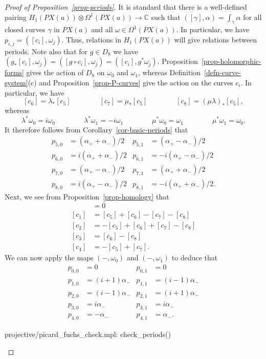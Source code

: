 \documentclass[reqno]{amsart}
\newcommand{\Om}        {\Omega}
\newcommand{\al}        {\alpha}
\newcommand{\gm}        {\gamma}
\newcommand{\lm}        {\lambda}
\newcommand{\om}        {\omega}
\newcommand{\C}         {{\mathbb{C}}}
\newcommand{\ot}        {\otimes}
\renewcommand{\:}{\colon}
\theoremstyle{definition}
\begin{document}
\begin{proof}[Proof of Proposition~\ref{prop-periods}]
 It is standard that there is a well-defined pairing
 $H_1(PX(a))\ot\Om^1(PX(a))\to\C$ such that $([\gm],\al)=\int_\gm\al$
 for all closed curves $\gm$ in $PX(a)$ and all $\om\in\Om^1(PX(a))$.
 In particular, we have $p_{i,j}=([c_i],\om_j)$.  Thus, relations in
 $H_1(PX(a))$ will give relations between periods.  Note also that for
 $g\in D_8$ we have
 $(g_*[c_i],\om_j)=([g\circ c_i],\om_j)=([c_i],g^*\om_j)$.
 Proposition~\ref{prop-holomorphic-forms} gives the action of $D_8$ on
 $\om_0$ and $\om_1$, whereas Definition~\ref{defn-curve-system}(c)
 and Proposition~\ref{prop-P-curves} give the action on the curves
 $c_i$.  In particular, we have
 \[ [c_6] = \lm_*[c_5] \hspace{4em}
    [c_7] = \mu_*[c_5] \hspace{4em}
    [c_8] = (\mu\lm)_*[c_5],
 \]
 whereas
 \[ \lm^*\om_0 = i\om_0 \hspace{4em}
    \lm^*\om_1 = -i\om_1 \hspace{4em}
    \mu^*\om_0 = \om_1  \hspace{4em}
    \mu^*\om_1 = \om_0.
 \]
 It therefore follows from Corollary~\ref{cor-basic-periods} that
 \begin{align*}
  p_{5,0} &=  (\al_++\al_-)/2 & p_{5,1} &=   (\al_+-\al_-)/2 \\
  p_{6,0} &= i(\al_++\al_-)/2 & p_{6,1} &= -i(\al_+-\al_-)/2 \\
  p_{7,0} &=  (\al_+-\al_-)/2 & p_{7,1} &=   (\al_++\al_-)/2 \\
  p_{8,0} &= i(\al_+-\al_-)/2 & p_{8,1} &= -i(\al_++\al_-)/2.
 \end{align*}
 Next, we see from Proposition~\ref{prop-homology} that
 \begin{align*}
  [c_0] &= 0 \\
  [c_1] &=  [c_5]+[c_6]-[c_7]-[c_8] \\
  [c_2] &= -[c_5]+[c_6]+[c_7]-[c_8] \\
  [c_3] &=        [c_6]      -[c_8] \\
  [c_4] &= -[c_5]      +[c_7].
 \end{align*}
 We can now apply the maps $(-,\om_0)$ and $(-,\om_1)$ to deduce that
 \begin{align*}
  p_{0,0} &=          0       & p_{0,1} &= 0          \\
  p_{1,0} &= (i+1)\al_-       & p_{1,1} &= (i-1)\al_- \\
  p_{2,0} &= (i-1)\al_-       & p_{2,1} &= (i+1)\al_- \\
  p_{3,0} &=     i\al_-       & p_{3,1} &=     i\al_- \\
  p_{4,0} &=     -\al_-       & p_{4,1} &=      \al_-.
 \end{align*}
 \begin{checks}
  projective/picard_fuchs_check.mpl: check_periods()
 \end{checks}
\end{proof}
\end{document}
